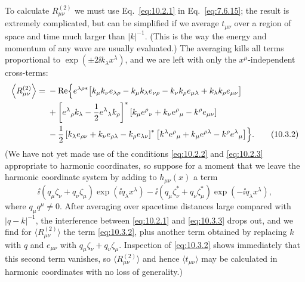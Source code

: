 To calculate \(R^{(2)}_{\mu\nu}\) we must use Eq.~\eqref{eq:10.2.1} in
Eq.~\eqref{eq:7.6.15}; the result is extremely complicated, but can be
simplified if we average \(t_{\mu\nu}\) over a region of space and time much
larger than \(\lvert k\rvert^{-1}\). (This is the way the energy and
momentum of any wave are usually evaluated.) The averaging kills all terms
proportional to \(\exp(\pm2\ii k_\lambda x^\lambda)\), and we are left with
only the \(x^\mu\)-independent cross-terms:
\begin{align}
  \left\langle R^{(2)}_{\mu\nu}\right\rangle
  ={}&-\operatorname{Re}\Bigl\{
  e^{\lambda\rho*}
  \bigl[
    k_\mu k_\nu e_{\lambda\rho}
    -k_\mu k_\lambda e_{\nu\rho}
    -k_\nu k_\rho e_{\mu\lambda}
    +k_\lambda k_\rho e_{\mu\nu}
  \bigr]
  \notag\\
  &+
  \left[
    e^\lambda{}_\rho k_\lambda
    -\frac12e^\lambda{}_\lambda k_\rho
  \right]^*
  \left[
    k_\mu e^\rho{}_\nu+k_\nu e^\rho{}_\mu-k^\rho e_{\mu\nu}
  \right]
  \notag\\
  &-\frac12
  \left[
    k_\lambda e_{\rho\nu}
    +k_\nu e_{\rho\lambda}
    -k_\rho e_{\lambda\nu}
  \right]^*
  \left[
    k^\lambda e^\rho{}_\mu
    +k_\mu e^{\rho\lambda}
    -k^\rho e^\lambda{}_\mu
  \right]
  \Bigr\}.
  \tag{10.3.2}\label{eq:10.3.2}
\end{align}
(We have not yet made use of the conditions \eqref{eq:10.2.2} and
\eqref{eq:10.2.3} appropriate to harmonic coordinates, so suppose for a
moment that we leave the harmonic coordinate system by adding to
\(h_{\mu\nu}(x)\) a term
\begin{equation}
  \ii(q_\mu\zeta_\nu+q_\nu\zeta_\mu)
  \exp(\ii q_\lambda x^\lambda)
  -\ii(q_\mu\zeta_\nu^*+q_\nu\zeta_\mu^*)
  \exp(-\ii q_\lambda x^\lambda),
  \tag{10.3.3}\label{eq:10.3.3}
\end{equation}
where \(q_\mu q^\mu\ne0\). After averaging over spacetime distances large
compared with \(\lvert q-k\rvert^{-1}\), the interference between
\eqref{eq:10.2.1} and \eqref{eq:10.3.3} drops out, and we find for
\(\langle R^{(2)}_{\mu\nu}\rangle\) the term \eqref{eq:10.3.2}, plus another
term obtained by replacing \(k\) with \(q\) and \(e_{\mu\nu}\) with
\(q_\mu\zeta_\nu+q_\nu\zeta_\mu\). Inspection of \eqref{eq:10.3.2} shows
immediately that this second term vanishes, so
\(\langle R^{(2)}_{\mu\nu}\rangle\) and hence
\(\langle t_{\mu\nu}\rangle\) may be calculated in harmonic coordinates with
no loss of generality.)

